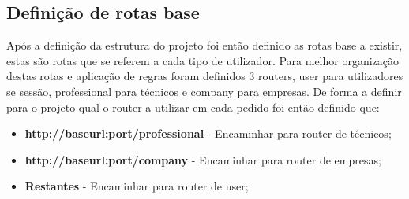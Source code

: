 \subsection{Definição de rotas base}
Após a definição da estrutura do projeto foi então definido as rotas base a existir, estas são rotas
que se referem a cada tipo de utilizador. Para melhor organização destas rotas e aplicação de regras foram definidos 3 routers, user para utilizadores se sessão, professional para técnicos e company para empresas. De forma a definir para o projeto qual o router a utilizar em cada pedido foi então definido que:
\begin{itemize}
  \item \textbf{http://baseurl:port/professional} - Encaminhar para router de técnicos;
  \item \textbf{http://baseurl:port/company} - Encaminhar para router de empresas;
  \item \textbf{Restantes} - Encaminhar para router de user;
\end{itemize}